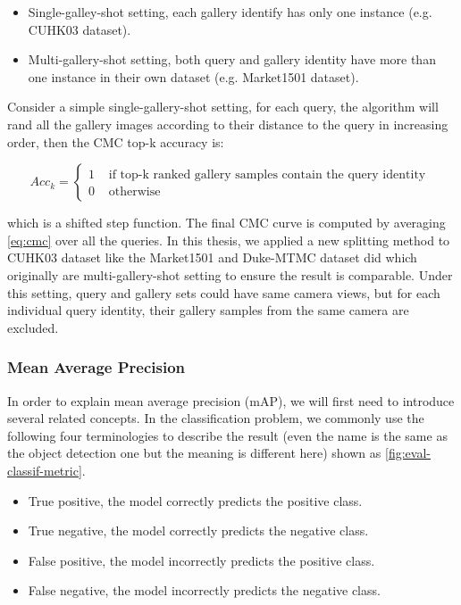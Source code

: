 \begin{itemize}
    \item Single-galley-shot setting,
    each gallery identify has only one instance (e.g. CUHK03 dataset).

    \item Multi-gallery-shot setting,
    both query and gallery identity have more than one instance in their own
    dataset (e.g. Market1501 dataset).
\end{itemize}

Consider a simple single-gallery-shot setting, for each query, the algorithm
will rand all the gallery images according to their distance to the query in
increasing order, then the CMC top-k accuracy is:

\begin{equation}
\label{eq:cmc}
\mathit{Acc}_{k}=
\left
\{\begin{array}{ll}
{1} & {\text { if top-k ranked gallery samples contain the query identity }} \\
{0} & {\text { otherwise }}
\end{array}
\right.
\end{equation}

\noindent which is a shifted step function. The final CMC curve is computed by
averaging \autoref{eq:cmc} over all the queries.
In this thesis, we applied a new splitting method \cite{dataset-cuhk03-np-2017}
to CUHK03 dataset like the Market1501 and Duke-MTMC dataset did which
originally are multi-gallery-shot setting to ensure the result is comparable.
Under this setting, query and gallery sets could have same camera views, but
for each individual query identity, their gallery samples from the same
camera are excluded.

\subsubsection{Mean Average Precision}
\label{sec:Eval-reid-map}

In order to explain mean average precision (mAP), we will first need to
introduce several related concepts. In the classification problem, we commonly
use the following four terminologies to describe the result (even the name is the
same as the object detection one but the meaning is different here) shown as
\autoref{fig:eval-classif-metric}.

\begin{itemize}
    \item True positive, the model correctly predicts the positive class.
    \item True negative, the model correctly predicts the negative class.
    \item False positive, the model incorrectly predicts the positive class.
    \item False negative, the model incorrectly predicts the negative class.
\end{itemize}

